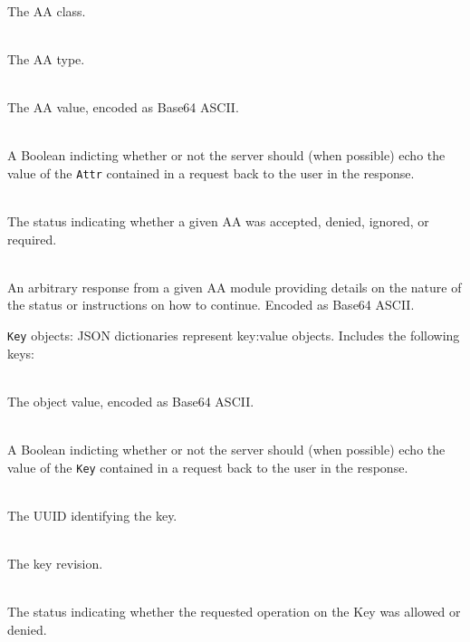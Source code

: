 \begin{packed_desc}
\item[\texttt{Class}] \hfill \\ The AA class.
\item[\texttt{Type}] \hfill \\ The AA type.
\item[\texttt{Value}] \hfill \\ The AA value, encoded as Base64 ASCII.
\item[\texttt{Echo}] \hfill \\ A Boolean indicting whether or not the
  server should (when possible) echo the value of the \texttt{Attr}
  contained in a request back to the user in the response.
\item[\texttt{Status} (Response Only)] \hfill \\ The status indicating
  whether a given AA was accepted, denied, ignored, or required.
\item[\texttt{ResValue} (Response Only)] \hfill \\ An arbitrary
  response from a given AA module providing details on the nature of
  the status or instructions on how to continue. Encoded as Base64
  ASCII.
\end{packed_desc}

\noindent
\texttt{Key} objects: JSON dictionaries represent key:value
objects. Includes the following keys:

\begin{packed_desc}
\item[\texttt{Value}] \hfill \\ The object value, encoded as
  Base64 ASCII.
\item[\texttt{Echo}] \hfill \\ A Boolean indicting whether or not the
  server should (when possible) echo the value of the \texttt{Key}
  contained in a request back to the user in the response.
\item[\texttt{UUID} (Response Only)] \hfill \\ The UUID identifying
  the key.
\item[\texttt{Revision} (Response Only)] \hfill \\ The key revision.
\item[\texttt{Status} (Response Only)] \hfill \\ The status indicating
  whether the requested operation on the Key was allowed or denied.
\end{packed_desc}

